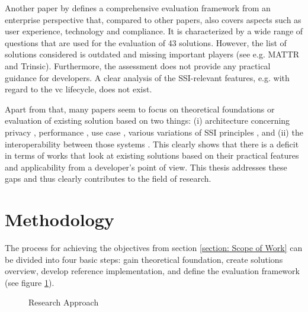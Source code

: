 	Another paper by \cite{kuperberg_blockchain-based_2020} defines a comprehensive evaluation framework from an enterprise perspective that, compared to other papers, also covers aspects such as user experience, technology and compliance. It is characterized by a wide range of questions that are used for the evaluation of 43 solutions. However, the list of solutions considered is outdated and missing important players (see e.g. MATTR and Trinsic). Furthermore, the assessment does not provide any practical guidance for developers. A clear analysis of the \ac{SSI}-relevant features, e.g. with regard to the \ac{vc} lifecycle, does not exist. 
	
	Apart from that, many papers seem to focus on theoretical foundations or evaluation of existing solution based on two things: (i) architecture \cite{gruner_relevance_2018} concerning privacy \cite{bernabe_privacy-preserving_2019}, performance \cite{bouras_distributed_2020}, use case \cite{kuperberg_blockchain-based_2020}, various variations \cite{allen_path_2016, sporny_decentralized_2021, allende_lopez_self-sovereign_2020, bouras_distributed_2020, ferdous_search_2019, cameron_laws_2005} of \ac{SSI} principles \cite{van_bokkem_self-sovereign_2019, bouras_distributed_2020, dib_decentralized_2020, dunphy_first_2018, ferdous_search_2019, friedewald_self-sovereign_2020}, and (ii) the interoperability between those systems \cite{homeland_security_preventing_2020, john_dhs_2020}. This clearly shows that there is a deficit in terms of works that look at existing solutions based on their practical features and applicability from a developer's point of view. This thesis addresses these gaps and thus clearly contributes to the field of research.
	
	\section{Methodology} %
    The process for achieving the objectives from section \ref{section: Scope of Work} can be divided into four basic steps: gain theoretical foundation, create solutions overview, develop reference implementation, and define the evaluation framework (see figure \ref{figure: approach}).
    
    \begin{figure}[ht]
	    \centering
        \caption{Research Approach}
        \label{figure: approach}
    \end{figure}
	
